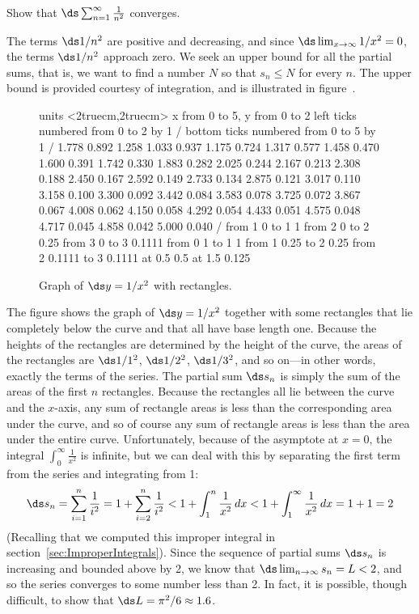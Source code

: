 \begin{example}{}{}
Show that $\ds\sum_{n=1}^\infty {1\over n^2}$ converges.
\end{example}
\begin{solution}
The terms $\ds 1/n^2$ are  positive and decreasing, and since 
$\ds\lim_{x\to\infty} 1/x^2=0$, the terms $\ds 1/n^2$ approach zero. We
seek an upper bound for all the partial sums, that is, we want to find
a number $N$ so that $s_n\le N$ for every $n$. The upper bound is
provided courtesy of integration, and is illustrated in
figure~.

\begin{figure}[H]
\centerline{
\vbox{\beginpicture
\normalgraphs
\setcoordinatesystem units <2truecm,2truecm>
\setplotarea x from 0 to 5, y from 0 to 2
\axis left ticks numbered from 0 to 2 by 1 /
\axis bottom  ticks numbered from 0 to 5 by 1 /
\setquadratic
{} 1.778 0.892 1.258 1.033 0.937 1.175 0.724 1.317 0.577 
1.458 0.470 1.600 0.391 1.742 0.330 1.883 0.282 2.025 0.244 
2.167 0.213 2.308 0.188 2.450 0.167 2.592 0.149 2.733 0.134 
2.875 0.121 3.017 0.110 3.158 0.100 3.300 0.092 3.442 0.084 
3.583 0.078 3.725 0.072 3.867 0.067 4.008 0.062 4.150 0.058 
4.292 0.054 4.433 0.051 4.575 0.048 4.717 0.045 4.858 0.042 
5.000 0.040 /
\putrule from 1 0 to 1 1 
\putrule from 2 0 to 2 0.25
\putrule from 3 0 to 3 0.1111
\putrule from 0 1 to 1 1 
\putrule from 1 0.25 to 2 0.25
\putrule from 2 0.1111 to 3 0.1111
{} at 0.5 0.5
 at 1.5 0.125
\endpicture}}
\caption{Graph of $\ds y=1/x^2$ with rectangles.}
\label{fig:integral test for one over n squared}
\end{figure}

The figure shows the graph of $\ds y=1/x^2$ together with some rectangles
that lie completely below the curve and that all have base length
one. Because the heights of the rectangles are determined by the
height of the curve, the areas of the rectangles are $\ds 1/1^2$, $\ds 1/2^2$,
$\ds 1/3^2$, and so on---in other words, exactly the terms of the
series. The partial sum $\ds s_n$ is simply the sum of the areas of the
first $n$ rectangles. Because the rectangles all lie between the curve
and the $x$-axis, any sum of rectangle areas is less than the
corresponding area under the curve, and so of course any sum of
rectangle areas is less than the area under the entire curve. Unfortunately,
because of the asymptote at $x=0$, the integral $\int_0^{\infty}\frac{1}{x^2}$
is infinite, but we can deal with this by separating the first term from
the series and integrating from 1:
\[\ds s_n=\sum_{i=1}^{n}\frac{1}{i^2}=1+\sum_{i=2}^{n}\frac{1}{i^2}<1+\int_1^n\frac{1}{x^2}\,dx<1+\int_1^{\infty}\frac{1}{x^2}\,dx=1+1=2\]
(Recalling that we computed this improper integral in 
section~\ref{sec:ImproperIntegrals}). Since the sequence of partial
sums $\ds s_n$ is increasing and bounded above by 2, we know that 
$\ds\lim_{n\to\infty}s_n=L<2$, and so the series converges to some
number less than 2. In fact, it is possible, though difficult, to show
that $\ds L=\pi^2/6\approx 1.6$.
\end{solution}

